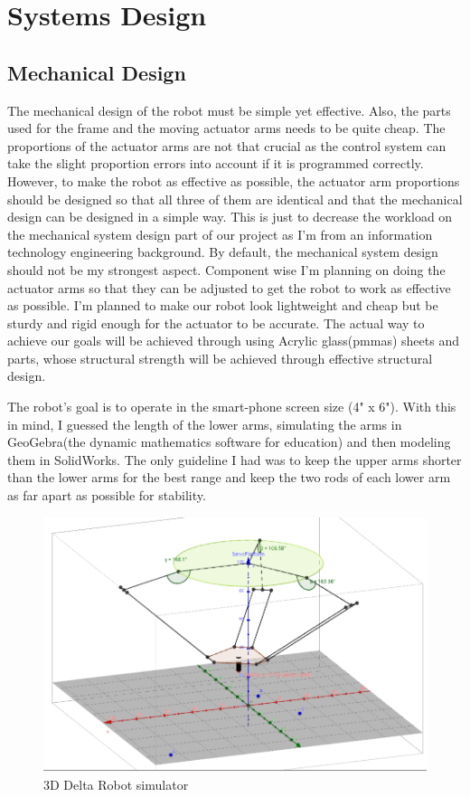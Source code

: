 \chapter{Systems Design}
\section{Mechanical Design}
The mechanical design of the robot must be simple yet effective. Also, the parts used for the frame and the moving actuator arms needs to be quite cheap. The proportions of the actuator arms are not that crucial as the control system can take the slight proportion errors into account if it is programmed correctly. However, to make the robot as effective as possible, the actuator arm proportions should be designed so that all three of them are identical and that the mechanical design can be designed in a simple way. This is just to decrease the workload on the mechanical system design part of our project as I'm from an information technology engineering background. By default, the mechanical system design should not be my strongest aspect. Component wise I'm planning on doing the actuator arms so that they can be adjusted to get the robot to work as effective as possible. I'm planned to make our robot look lightweight and cheap but be sturdy and rigid enough for the actuator to be  accurate. The actual way to achieve our goals will be achieved through using Acrylic glass(\glspl{pmma}) sheets and parts, whose structural strength will be achieved through effective structural design.

The robot's goal is to operate in the smart-phone screen size (4" x 6"). With this in mind, I guessed the length of the lower arms, simulating the arms in GeoGebra\cite{GeoGebra_thesis}(the dynamic mathematics software for education) and then modeling them in SolidWorks. The only guideline I had was to keep the upper arms shorter than the lower arms for the best range and keep the two rods of each lower arm as far apart as possible for stability.
\begin{figure}[H]	
	\centering
	\includegraphics[width=\maxwidth{15cm}, keepaspectratio]{Chapters/Fig/3D_delta_robot_simulator.png}
	\caption{3D Delta Robot simulator\cite{GeoGebra_deltarobot_simulator_thesis}}
	\label{fig:3D_delta_robot_simulator}
\end{figure}

